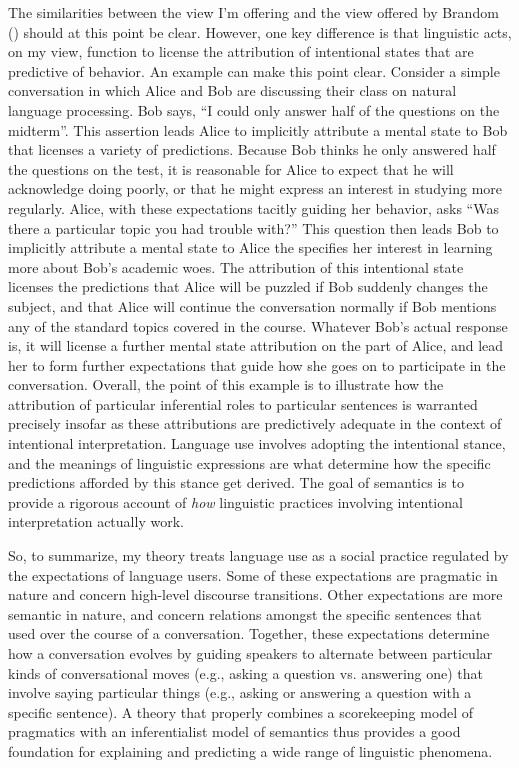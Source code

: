 The similarities between the view I'm offering and the view offered by Brandom (\citeyear{Brandom:1994}) should at this point be clear. However, one key difference is that linguistic acts, on my view, function to license the attribution of intentional states that are predictive of behavior. An example can make this point clear. Consider a simple conversation in which Alice and Bob are discussing their class on natural language processing. Bob says, ``I could only answer half of the questions on the midterm''. This assertion leads Alice to implicitly attribute a mental state to Bob that licenses a variety of predictions. Because Bob thinks he only answered half the questions on the test, it is reasonable for Alice to expect that he will acknowledge doing poorly, or that he might express an interest in studying more regularly. Alice, with these expectations tacitly guiding her behavior, asks ``Was there a particular topic you had trouble with?'' This question then leads Bob to implicitly attribute a mental state to Alice the specifies her interest in learning more about Bob's academic woes. The attribution of this intentional state licenses the predictions that Alice will be puzzled if Bob suddenly changes the subject, and that Alice will continue the conversation normally if Bob mentions any of the standard topics covered in the course. Whatever Bob's actual response is, it will license a further mental state attribution on the part of Alice, and lead her to form further expectations that guide how she goes on to participate in the conversation. Overall, the point of this example is to illustrate how the attribution of particular inferential roles to particular sentences is warranted precisely insofar as these attributions are predictively adequate in the context of intentional interpretation. Language use involves adopting the intentional stance, and the meanings of linguistic expressions are what determine how the specific predictions afforded by this stance get derived. The goal of semantics is to provide a rigorous account of \textit{how} linguistic practices involving intentional interpretation actually work. 

So, to summarize, my theory treats language use as a social practice regulated by the expectations of language users. Some of these expectations are pragmatic in nature and concern high-level discourse transitions. Other expectations are more semantic in nature, and concern relations amongst the specific sentences that used over the course of a conversation. Together, these expectations determine how a conversation evolves by guiding speakers to alternate between particular kinds of conversational moves (e.g., asking a question vs. answering one) that involve saying particular things (e.g., asking or answering a question with a specific sentence). A theory that properly combines a scorekeeping model of pragmatics with an inferentialist model of semantics thus provides a good foundation for explaining and predicting a wide range of linguistic phenomena. 

